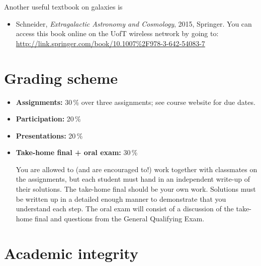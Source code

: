 \documentclass{article}
\begin{document}
Another useful textbook on galaxies is

\begin{itemize}

  \item Schneider, \emph{Extragalactic Astronomy and Cosmology}, 2015, Springer. You can access this book online on the UofT wireless network by going to:
{\footnotesize \url{http://link.springer.com/book/10.1007%2F978-3-642-54083-7}}

\end{itemize}

\section*{Grading scheme}

\begin{itemize}

  \item {\bf Assignments:} 30\,\% over three assignments; see course website for due dates.

  \item {\bf Participation:} 20\,\%

  \item {\bf Presentations:} 20\,\%

  \item {\bf Take-home final + oral exam:} 30\,\%

You are allowed to (and are encouraged to!) work together with
classmates on the assignments, but each student must hand in an
independent write-up of their solutions. The take-home final should be
your own work. Solutions must be written up in a detailed enough
manner to demonstrate that you understand each step. The oral exam
will consist of a discussion of the take-home final and questions from
the General Qualifying Exam.

\end{itemize}

\section*{Academic integrity}
\end{document}

